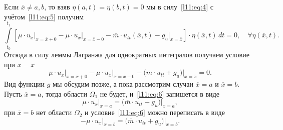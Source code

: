 Если $\overline{x}\neq a,b$, то взяв $\eta(a,t)=\eta(b,t)=0$ мы в силу~\eqref{l11:eq:4} с учётом~\eqref{l11:eq:5} получим
\begin{equation*}
	\int\limits_{t_0}^{t_1}\left[\mu\cdot u_x\bigg|_{x=\overline{x}+0}\!\!\!\!\!\!-\mu\cdot u_x\bigg|_{x=\overline{x}-0}\!\!\!\!\!\!-\overline{m}\cdot u_{tt}(\overline{x},t)-g_u\bigg|_{x=\overline{x}}\right]\cdot\eta(\overline{x},t)\,dt=0,\quad\!\!\!\!\forall\eta(\overline{x},t).
\end{equation*}
Отсюда в силу леммы Лагранжа для однократных интегралов получаем условие при $x=\overline{x}$
\begin{equation}
	\label{l11:eq:6}
	 \mu\cdot u_x\bigg|_{x=\overline{x}+0}-\mu\cdot u_x\bigg|_{x=\overline{x}-0}-\big(\overline{m}\cdot u_{tt}+g_u\big)\bigg|_{x=\overline{x}}=0.
\end{equation}
Вид функции $g$ мы обсудим позже, а пока рассмотрим случаи $\overline{x}=a$ и $\overline{x}=b$. Пусть $\overline{x}=a$, тогда области $\Omega_1$ не будет, и~\eqref{l11:eq:6} запишется в виде 
\begin{equation}
	\label{l11:eq:7}
	\mu\cdot u_x\bigg|_{x=a}=\big(\overline{m}\cdot u_{tt}+g_u\big)\bigg|_{x=a},
\end{equation}
при $\overline{x}=b$ нет области $\Omega_2$ и условие~\eqref{l11:eq:6} можно переписать в виде 
\begin{equation}
	\label{l11:eq:8}
	-\mu\cdot u_x\bigg|_{x=b}=\big(\overline{m}\cdot u_{tt}+g_u\big)\bigg|_{x=b}.
\end{equation} 


